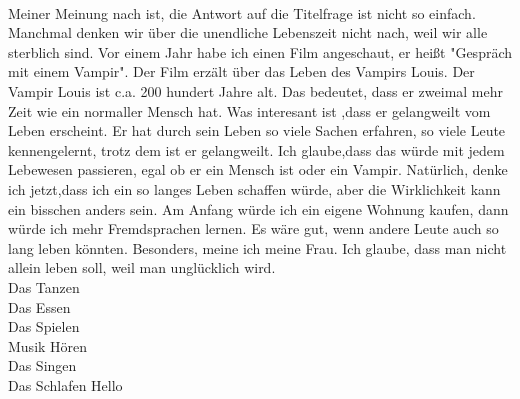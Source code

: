 \documentclass[a4paper,12pt]{article}
\begin{document}
\vspace{2pc}
\\{}
Meiner Meinung nach ist, die Antwort auf die Titelfrage ist nicht so einfach. Manchmal denken wir \"uber die unendliche Lebenszeit nicht nach, weil wir alle sterblich sind.
Vor einem Jahr habe ich einen Film angeschaut, er hei{\ss}t "Gespr\"ach mit einem Vampir". Der Film erz\"alt \"uber das Leben des Vampirs Louis. Der Vampir Louis ist
c.a. 200 hundert Jahre alt. Das bedeutet, dass er zweimal mehr Zeit wie ein normaller Mensch hat. Was interesant ist ,dass er gelangweilt vom Leben erscheint.
Er hat durch sein Leben so viele Sachen erfahren, so viele Leute kennengelernt, trotz dem ist er gelangweilt. Ich glaube,dass das w\"urde mit jedem Lebewesen passieren, egal ob
er ein Mensch ist oder ein Vampir. Nat\"urlich, denke ich jetzt,dass ich ein so langes Leben schaffen w\"urde, aber die Wirklichkeit kann ein bisschen anders sein.
Am Anfang w\"urde ich ein eigene Wohnung kaufen, dann w\"urde ich mehr Fremdsprachen lernen. Es w\"are gut, wenn andere Leute auch so lang leben k\"onnten. Besonders, meine ich meine
Frau. Ich glaube, dass man nicht allein leben soll, weil man ungl\"ucklich wird.
\vspace{2pc}\\
Das Tanzen\\Das Essen\\Das Spielen\\Musik H\"oren\\Das Singen\\Das Schlafen
Hello
\end{document}
